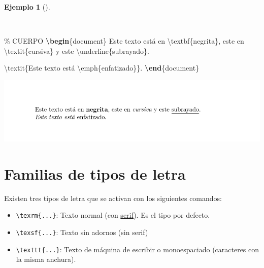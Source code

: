 \documentclass[
  a4paper,
]{scrreport}
\newenvironment{Shaded}{\begin{snugshade}}{\end{snugshade}}
\newcommand{\CommentTok}[1]{\textcolor[rgb]{0.37,0.37,0.37}{#1}}
\newcommand{\ExtensionTok}[1]{\textcolor[rgb]{0.00,0.23,0.31}{#1}}
\newcommand{\FunctionTok}[1]{\textcolor[rgb]{0.28,0.35,0.67}{#1}}
\newcommand{\KeywordTok}[1]{\textcolor[rgb]{0.00,0.23,0.31}{\textbf{#1}}}
\newcommand{\NormalTok}[1]{\textcolor[rgb]{0.00,0.23,0.31}{#1}}
\providecommand{\tightlist}{%
  \setlength{\itemsep}{0pt}\setlength{\parskip}{0pt}}\usepackage{longtable,booktabs,array}
\theoremstyle{definition}
\newtheorem{example}{Ejemplo}[chapter]
\theoremstyle{remark}
\begin{document}
\begin{example}[]\protect\hypertarget{exm-formateo}{}\label{exm-formateo}

~

\begin{Shaded}
\begin{Highlighting}[]
\CommentTok{\% CUERPO}
\KeywordTok{\textbackslash{}begin}\NormalTok{\{}\ExtensionTok{document}\NormalTok{\}}
\NormalTok{Este texto está en }\FunctionTok{\textbackslash{}textbf}\NormalTok{\{negrita\}, este en }\FunctionTok{\textbackslash{}textit}\NormalTok{\{cursiva\} y este }
\FunctionTok{\textbackslash{}underline}\NormalTok{\{subrayado\}. }

\FunctionTok{\textbackslash{}textit}\NormalTok{\{Este texto está }\FunctionTok{\textbackslash{}emph}\NormalTok{\{enfatizado\}\}.}
\KeywordTok{\textbackslash{}end}\NormalTok{\{}\ExtensionTok{document}\NormalTok{\}}
\end{Highlighting}
\end{Shaded}

\begin{tcolorbox}[enhanced jigsaw, colframe=quarto-callout-note-color-frame, opacityback=0, title={Salida}, bottomrule=.15mm, left=2mm, coltitle=black, arc=.35mm, leftrule=.75mm, colback=white, rightrule=.15mm, colbacktitle=quarto-callout-note-color!10!white, toprule=.15mm, breakable, opacitybacktitle=0.6, bottomtitle=1mm, toptitle=1mm, titlerule=0mm]

\includegraphics{img/formateo/resaltado.png}

\end{tcolorbox}

\end{example}

\section{Familias de tipos de letra}\label{familias-de-tipos-de-letra}

Existen tres tipos de letra que se activan con los siguientes comandos:

\begin{itemize}
\tightlist
\item
  \texttt{\textbackslash{}texrm\{...\}}: Texto normal (con
  \href{https://en.wikipedia.org/wiki/Serif}{serif}). Es el tipo por
  defecto.
\item
  \texttt{\textbackslash{}texsf\{...\}}: Texto sin adornos (sin serif)
\item
  \texttt{\textbackslash{}texttt\{...\}}: Texto de máquina de escribir o
  monoespaciado (caracteres con la misma anchura).
\end{itemize}
\end{document}
